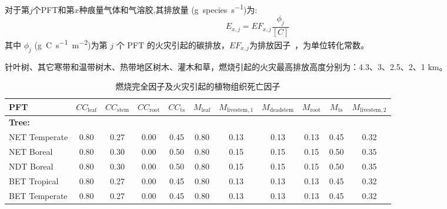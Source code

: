 对于第$j$个PFT和第$x$种痕量气体和气溶胶,其排放量 (\unit{g.species.s^{-1}})为:
\begin{equation}
  E_{x,j}=E F_{x,j} \frac{\phi_{j}}{[C]}
\end{equation}
其中 $\phi_{j}$ (\unit{g.C.s^{-1}.m^{-2}})为第 $j$ 个 PFT 的火灾引起的碳排放，$E F_{x,j}$为排放因子~\citep{LiF2019}，为单位转化常数。

针叶树、其它寒带和温带树木、热带地区树木、灌木和草，燃烧引起的火灾最高排放高度分别为：4.3、3、2.5、2、1 km。
\begin{landscape}
  \begin{table}[htbp]
    \caption{燃烧完全因子及火灾引起的植物组织死亡因子}
    \label{tab:burning_factors}
    \begin{tabular}{lcccccccccc}
      \toprule
      PFT                                   & $CC_{\mathrm{leaf}}$ & $CC_{\mathrm{stem}}$ & $CC_{\mathrm{root}}$ & $CC_{\mathrm{ts}}$ & $M_{\mathrm{leaf}}$ & $M_{\mathrm{livestem,1}}$ & $M_{\mathrm{deadstem}}$ & $M_{\mathrm{root}}$ & $M_{\mathrm{ts}}$ & $M_{\mathrm{livestem,2}}$ \\ \midrule
      \multicolumn{11}{l}{\textbf{Tree:}}  \\
      NET Temperate                         & 0.80                 & 0.27                 & 0.00                 & 0.45               & 0.80                & 0.13                      & 0.13                    & 0.13                & 0.45              & 0.32                      \\
      NET Boreal                            & 0.80                 & 0.30                 & 0.00                 & 0.50               & 0.80                & 0.15                      & 0.15                    & 0.15                & 0.50              & 0.35                      \\
      NDT Boreal                            & 0.80                 & 0.30                 & 0.00                 & 0.50               & 0.80                & 0.15                      & 0.15                    & 0.15                & 0.50              & 0.35                      \\
      BET Tropical                          & 0.80                 & 0.27                 & 0.00                 & 0.45               & 0.80                & 0.13                      & 0.13                    & 0.13                & 0.45              & 0.32                      \\
      BET Temperate                         & 0.80                 & 0.27                 & 0.00                 & 0.45               & 0.80                & 0.13                      & 0.13                    & 0.13                & 0.45              & 0.32                      \\

\end{tabular}
\end{table}
\end{landscape}

